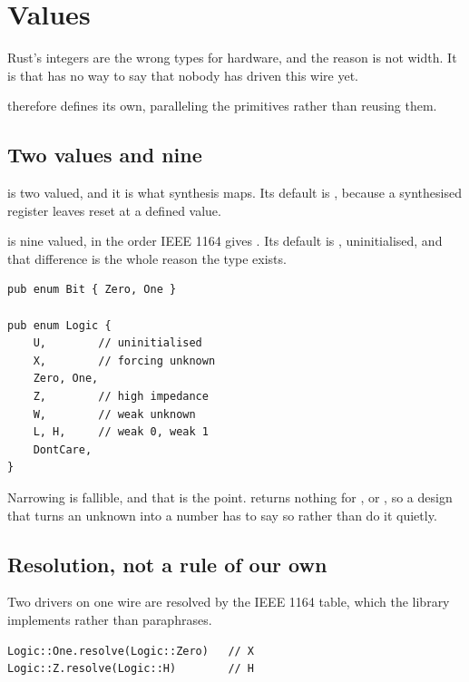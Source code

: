 \section{Values}
\label{sec:e-values}

Rust's integers are the wrong types for hardware, and the reason is not
width. It is that  has no way to say that nobody has driven this
wire yet.

 therefore defines its own, paralleling the primitives
rather than reusing them.

\subsection{Two values and nine}

 is two valued, and it is what synthesis maps. Its default is
, because a synthesised register leaves reset at a defined
value.

 is nine valued, in the order IEEE 1164 gives
. Its default is , uninitialised, and that
difference is the whole reason the type exists.

\begin{lstlisting}[caption={The two value types. An undriven wire is \code{U}, not zero.},label={lst:bitlogic}]
pub enum Bit { Zero, One }

pub enum Logic {
    U,        // uninitialised
    X,        // forcing unknown
    Zero, One,
    Z,        // high impedance
    W,        // weak unknown
    L, H,     // weak 0, weak 1
    DontCare,
}
\end{lstlisting}

Narrowing is fallible, and that is the point. 
returns nothing for ,  or , so a design that turns
an unknown into a number has to say so rather than do it quietly.

\subsection{Resolution, not a rule of our own}

Two drivers on one wire are resolved by the IEEE 1164 table, which the
library implements rather than paraphrases.

\begin{lstlisting}[caption={Resolution. Contention gives \code{X}; a pull-up against high impedance gives \code{H}.},label={lst:resolve}]
Logic::One.resolve(Logic::Zero)   // X
Logic::Z.resolve(Logic::H)        // H
\end{lstlisting}

